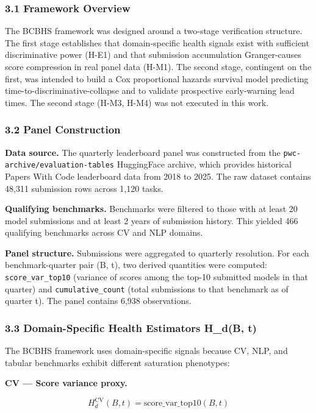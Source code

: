 
\subsubsection{3.1 Framework Overview}

The BCBHS framework was designed around a two-stage verification structure. The first stage establishes that domain-specific health signals exist with sufficient discriminative power (H-E1) and that submission accumulation Granger-causes score compression in real panel data (H-M1). The second stage, contingent on the first, was intended to build a Cox proportional hazards survival model predicting time-to-discriminative-collapse and to validate prospective early-warning lead times. The second stage (H-M3, H-M4) was not executed in this work.

\subsubsection{3.2 Panel Construction}

\textbf{Data source.} The quarterly leaderboard panel was constructed from the \texttt{pwc-archive/evaluation-tables} HuggingFace archive, which provides historical Papers With Code leaderboard data from 2018 to 2025. The raw dataset contains 48,311 submission rows across 1,120 tasks.

\textbf{Qualifying benchmarks.} Benchmarks were filtered to those with at least 20 model submissions and at least 2 years of submission history. This yielded 466 qualifying benchmarks across CV and NLP domains.

\textbf{Panel structure.} Submissions were aggregated to quarterly resolution. For each benchmark-quarter pair (B, t), two derived quantities were computed: \texttt{score_var_top10} (variance of scores among the top-10 submitted models in that quarter) and \texttt{cumulative_count} (total submissions to that benchmark as of quarter t). The panel contains 6,938 observations.

\subsubsection{3.3 Domain-Specific Health Estimators H_d(B, t)}

The BCBHS framework uses domain-specific signals because CV, NLP, and tabular benchmarks exhibit different saturation phenotypes:

\textbf{CV — Score variance proxy.}

$$H_d^{\text{CV}}(B, t) = \text{score\_var\_top10}(B, t)$$

